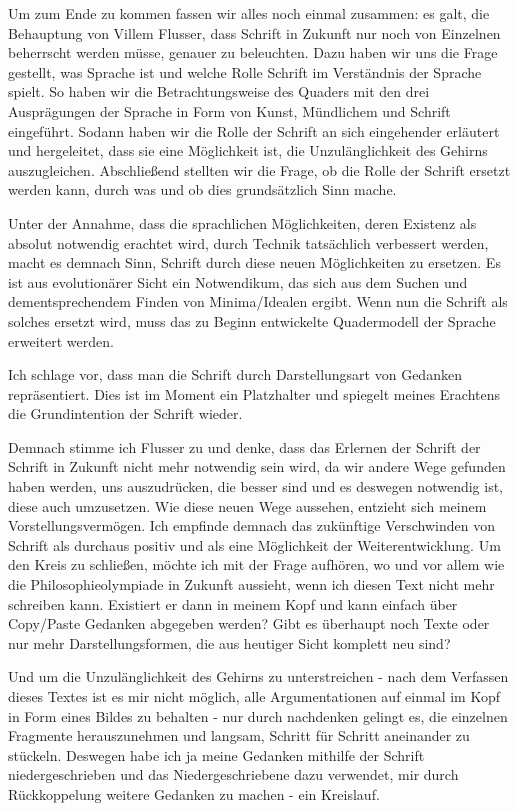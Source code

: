 \documentclass[12pt,a4paper,oneside]{article}
\begin{document}
  Um zum Ende zu kommen fassen wir alles noch einmal zusammen: es galt, die Behauptung von Villem Flusser, dass Schrift in Zukunft nur noch von Einzelnen beherrscht werden müsse, genauer zu beleuchten. Dazu haben wir uns die Frage gestellt, was Sprache ist und welche Rolle Schrift im Verständnis der Sprache spielt. So haben wir die Betrachtungsweise des Quaders mit den drei Ausprägungen der Sprache in Form von Kunst, Mündlichem und Schrift eingeführt. Sodann haben wir die Rolle der Schrift an sich eingehender erläutert und hergeleitet, dass sie eine Möglichkeit ist, die Unzulänglichkeit des Gehirns auszugleichen. Abschließend stellten wir die Frage, ob die Rolle der Schrift ersetzt werden kann, durch was und ob dies grundsätzlich Sinn mache.
  
  Unter der Annahme, dass die sprachlichen Möglichkeiten, deren Existenz als absolut notwendig erachtet wird, durch Technik tatsächlich verbessert werden, macht es demnach Sinn, Schrift durch diese neuen Möglichkeiten zu ersetzen. Es ist aus evolutionärer Sicht ein Notwendikum, das sich aus dem Suchen und dementsprechendem Finden von Minima/Idealen ergibt. Wenn nun die Schrift als solches ersetzt wird, muss das zu Beginn entwickelte Quadermodell der Sprache erweitert werden.
  
  Ich schlage vor, dass man die Schrift durch Darstellungsart von Gedanken repräsentiert. Dies ist im Moment ein Platzhalter und spiegelt meines Erachtens die Grundintention der Schrift wieder.
  
  Demnach stimme ich Flusser zu und denke, dass das Erlernen der Schrift der Schrift in Zukunft nicht mehr notwendig sein wird, da wir andere Wege gefunden haben werden, uns auszudrücken, die besser sind und es deswegen notwendig ist, diese auch umzusetzen. Wie diese neuen Wege aussehen, entzieht sich meinem Vorstellungsvermögen. Ich empfinde demnach das zukünftige Verschwinden von Schrift als durchaus positiv und als eine Möglichkeit der Weiterentwicklung. Um den Kreis zu schließen, möchte ich mit der Frage aufhören, wo und vor allem wie die Philosophieolympiade in Zukunft aussieht, wenn ich diesen Text nicht mehr schreiben kann. Existiert er dann in meinem Kopf und kann einfach über Copy/Paste Gedanken abgegeben werden? Gibt es überhaupt noch Texte oder nur mehr Darstellungsformen, die aus heutiger Sicht komplett neu sind?
  
  Und um die Unzulänglichkeit des Gehirns zu unterstreichen - nach dem Verfassen dieses Textes ist es mir nicht möglich, alle Argumentationen auf einmal im Kopf in Form eines Bildes zu behalten - nur durch nachdenken gelingt es, die einzelnen Fragmente herauszunehmen und langsam, Schritt für Schritt aneinander zu stückeln. Deswegen habe ich ja meine Gedanken mithilfe der Schrift niedergeschrieben und das Niedergeschriebene dazu verwendet, mir durch Rückkoppelung weitere Gedanken zu machen - ein Kreislauf.
  
\end{document}
